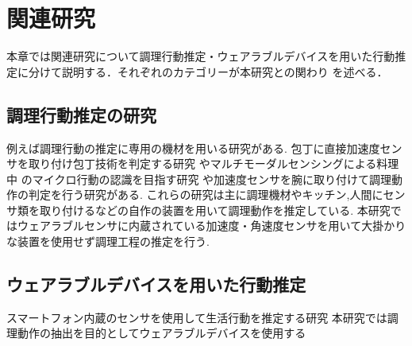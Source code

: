 \section{関連研究}
本章では関連研究について調理行動推定・ウェアラブルデバイスを用いた行動推定に分けて説明する．それぞれのカテゴリーが本研究との関わり
を述べる．
\subsection{調理行動推定の研究}
例えば調理行動の推定に専用の機材を用いる研究がある.
包丁に直接加速度センサを取り付け包丁技術を判定する研究\cite{加速度センサを用いた包丁技術向上支援システムの提案} やマルチモーダルセンシングによる料理中
のマイクロ行動の認識を目指す研究\cite{マルチモーダルセンシングに基づく料理中のマイクロ行動認識の提案}
や加速度センサを腕に取り付けて調理動作の判定を行う研究\cite{手首装着型の加速度センサを用いた実時間調理行動認識手法の実現}がある.
これらの研究は主に調理機材やキッチン,人間にセンサ類を取り付けるなどの自作の装置を用いて調理動作を推定している.
本研究ではウェアラブルセンサに内蔵されている加速度・角速度センサを用いて大掛かりな装置を使用せず調理工程の推定を行う.
\subsection{ウェアラブルデバイスを用いた行動推定}
スマートフォン内蔵のセンサを使用して生活行動を推定する研究
\cite{携帯電話搭載センサによるリアルタイム生活行動認識システム}
本研究では調理動作の抽出を目的としてウェアラブルデバイスを使用する

